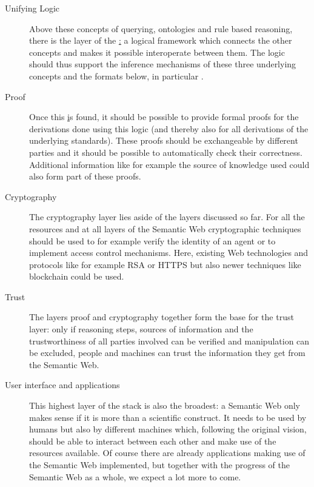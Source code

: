  \begin{description}
 \item[Unifying Logic]
 Above these concepts of querying, ontologies and rule based reasoning, there is the layer of the \ul: 
 a logical framework which connects the other concepts and makes it possible interoperate between them. 
The logic should thus support the inference mechanisms of these three underlying concepts and the formats below, in particular \rdf.
 \item[Proof]
 Once this \ul is found, it should be possible to provide formal proofs for the derivations done using this logic (and thereby also for all derivations of the underlying standards). 
 These proofs should be exchangeable by different parties and it should be possible to automatically check their correctness. Additional information like for example the source of knowledge 
 used could also form part
 of these proofs.
 \item[Cryptography]
 The cryptography layer lies aside of the layers discussed so far. For all the resources and at all layers of the Semantic Web cryptographic techniques should be used 
 to for example verify the identity of an agent or to implement access control mechanisms. Here, existing Web technologies and protocols like for example RSA or HTTPS but 
 also newer techniques like blockchain could be used.
 \item[Trust]
 The layers proof and cryptography together form the base for the trust layer: only if reasoning steps, sources of information and the trustworthiness of all parties involved
 can be verified and manipulation 
 can be excluded, people and machines can trust the information they get from the Semantic Web.
 \item[User interface and applications]
 This highest layer of the stack is also the broadest: a Semantic Web only makes sense if it is more than a scientific construct. 
 It needs to be used by humans but also by different machines which, following
 the original vision, should be able to interact between each other and make use of the resources available. Of course there are already applications making use of the Semantic Web implemented, but
 together with the progress of the Semantic Web as a whole, we expect a lot more to come.
\end{description}

